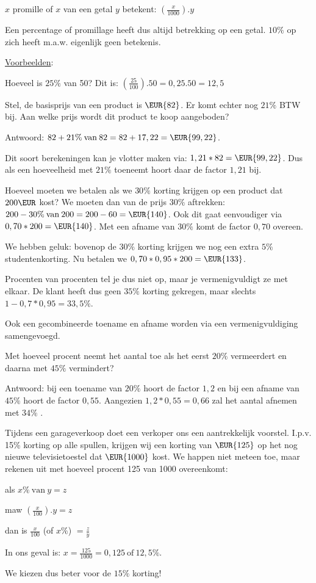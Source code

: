 \noindent $x$ promille of $x$ \textpertenthousand van een getal $y$ betekent:
${\displaystyle \left(\frac{x}{1000}\right).y}$

\noindent Een percentage of promillage heeft dus altijd betrekking
op een getal. $10\%$ op zich heeft m.a.w. eigenlijk geen betekenis.

\medskip{}


\uline{Voorbeelden}:

Hoeveel is $25\%$ van 50? Dit is: ${\displaystyle \left(\frac{25}{100}\right).50=0,25.50=12,5}$

Stel, de basisprijs van een product is $\EUR{82}$. Er komt
echter nog $21\%$ BTW bij. Aan welke prijs wordt dit product te koop
aangeboden?

Antwoord: ${\displaystyle 82+21\%\:\mathrm{van\:}82=82+17,22=\EUR{99,22}}$.

Dit soort berekeningen kan je vlotter maken via: $1,21*82=\EUR{99,22}$.
Dus als een hoeveelheid met $21\%$ toeneemt hoort daar de factor
$1,21$ bij.

Hoeveel moeten we betalen als we $30\%$ korting krijgen op een product
dat $200\EUR$ kost? We moeten dan van de prijs $30\%$
aftrekken: ${\displaystyle 200-30\%\:\mathrm{van\:}200=200-60=\EUR{140}}$.
Ook dit gaat eenvoudiger via $0,70*200=\EUR{140}$. Met een afname
van $30\%$ komt de factor $0,70$ overeen.

\medskip{}


We hebben geluk: bovenop de $30\%$ korting krijgen we nog een extra
$5\%$ studentenkorting. Nu betalen we $0,70*0,95*200=\EUR{133}$.

Procenten van procenten tel je dus niet op, maar je vermenigvuldigt
ze met elkaar. De klant heeft dus geen $35\%$ korting gekregen, maar
slechts $1-0,7*0,95=33,5\%$.

\medskip{}


\noindent Ook een gecombineerde toename en afname worden via een vermenigvuldiging
samengevoegd.

\noindent Met hoeveel procent neemt het aantal toe als het eerst $20\%$
vermeerdert en daarna met $45\%$ vermindert?

\noindent Antwoord: bij een toename van $20\%$ hoort de factor $1,2$
en bij een afname van $45\%$ hoort de factor $0,55$. Aangezien $1,2*0,55=0,66$
zal het aantal afnemen met $34\%$ .

\medskip{}


\noindent Tijdens een garageverkoop doet een verkoper ons een aantrekkelijk
voorstel. I.p.v. 15\% korting op alle spullen, krijgen wij een korting
van $\EUR{125}$ op het nog nieuwe televisietoestel dat $\EUR{1000}$
kost. We happen niet meteen toe, maar rekenen uit met hoeveel procent
125 van 1000 overeenkomt:

als $x\%\:\mathrm{van}\:y=z$

maw ${\displaystyle \left(\frac{x}{100}\right).y=z}$

dan is ${\displaystyle \frac{x}{100}}$ (of $x\%$) ${\displaystyle =\frac{z}{y}}$

In ons geval is: ${\displaystyle x=\frac{125}{1000}=0,125\:\mathrm{of}\:12,5\%}$.

We kiezen dus beter voor de $15\%$ korting!
